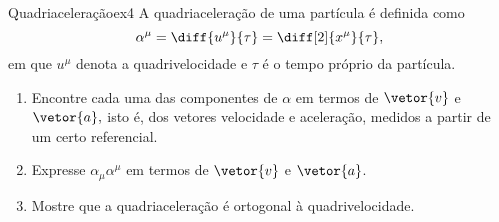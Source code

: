 \begin{exercício}{Quadriaceleração}{ex4}
   A quadriaceleração de uma partícula é definida como
   \begin{equation*}
      \alpha^\mu = \diff{u^\mu}{\tau} = \diff[2]{x^\mu}{\tau},
   \end{equation*}
   em que \(u^\mu\) denota a quadrivelocidade e \(\tau\) é o tempo próprio da partícula.
   \begin{enumerate}[label=(\alph*)]
      \item Encontre cada uma das componentes de \(\alpha\) em termos de \(\vetor{v}\) e \(\vetor{a},\) isto é, dos vetores velocidade e aceleração, medidos a partir de um certo referencial.
      \item Expresse \(\alpha_\mu \alpha^\mu\) em termos de \(\vetor{v}\) e \(\vetor{a}\).
      \item Mostre que a quadriaceleração é ortogonal à quadrivelocidade.
   \end{enumerate}
\end{exercício}
